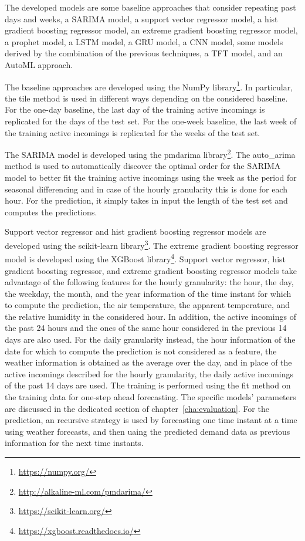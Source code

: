 The developed models are some baseline approaches that consider repeating past days and weeks, a SARIMA model, a support vector regressor model, a hist gradient boosting regressor model, an extreme gradient boosting regressor model, a prophet model, a LSTM model, a GRU model, a CNN model, some models derived by the combination of the previous techniques, a TFT model, and an AutoML approach.

The baseline approaches are developed using the NumPy library\footnote{ \url{https://numpy.org/} }.
In particular, the tile method is used in different ways depending on the considered baseline.
For the one-day baseline, the last day of the training active incomings is replicated for the days of the test set.
For the one-week baseline, the last week of the training active incomings is replicated for the weeks of the test set.

The SARIMA model is developed using the pmdarima library\footnote{ \url{http://alkaline-ml.com/pmdarima/} }.
The auto\_arima method is used to automatically discover the optimal order for the SARIMA model to better fit the training active incomings using the week as the period for seasonal differencing and in case of the hourly granularity this is done for each hour.
For the prediction, it simply takes in input the length of the test set and computes the predictions.

Support vector regressor and hist gradient boosting regressor models are developed using the scikit-learn library\footnote{ \url{https://scikit-learn.org/} }.
The extreme gradient boosting regressor model is developed using the XGBoost library\footnote{ \url{https://xgboost.readthedocs.io/} }.
Support vector regressor, hist gradient boosting regressor, and extreme gradient boosting regressor models take advantage of the following features for the hourly granularity: the hour, the day, the weekday, the month, and the year information of the time instant for which to compute the prediction, the air temperature, the apparent temperature, and the relative humidity in the considered hour.
In addition, the active incomings of the past 24 hours and the ones of the same hour considered in the previous 14 days are also used.
For the daily granularity instead, the hour information of the date for which to compute the prediction is not considered as a feature, the weather information is obtained as the average over the day, and in place of the active incomings described for the hourly granularity, the daily active incomings of the past 14 days are used.
The training is performed using the fit method on the training data for one-step ahead forecasting.
The specific models’ parameters are discussed in the dedicated section of chapter~\ref{cha:evaluation}.
For the prediction, an recursive strategy is used by forecasting one time instant at a time using weather forecasts, and then uaing the predicted demand data as previous information for the next time instants.

